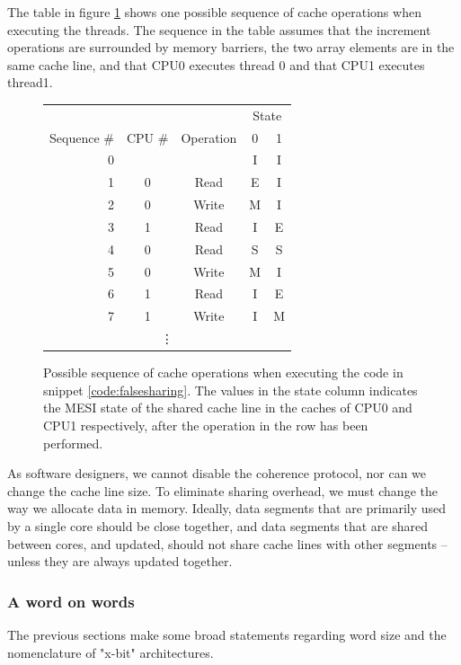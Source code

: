 The table in figure \ref{table:invalidationsequence} shows one possible sequence
of cache operations when executing the threads. The sequence in the table
assumes that the increment operations are surrounded by memory barriers, the two
array elements are in the same cache line, and that CPU0 executes thread 0 and
that CPU1 executes thread1.

\begin{figure}[hbtp]
	\centering
	\begin{tabular}{|r|c|c||c|c|}
	\hline
	& & & \multicolumn{2}{c|}{State} \\
		\cline{4-5}
	Sequence \# & CPU \# & Operation & 0 & 1\\
	\hline
	\hline
	0 & & & I & I\\
	\hline
	1 & 0 & Read & E & I\\
	\hline
	2 & 0 & Write & M & I\\
	\hline
	3 & 1 & Read & I & E\\
	\hline
	4 & 0 & Read & S & S\\
	\hline
	5 & 0 & Write & M & I\\
	\hline
	6 & 1 & Read & I & E\\
	\hline
	7 & 1 & Write & I & M\\
		\multicolumn{5}{c}{\vdots}
\end{tabular}
	\caption{Possible sequence of cache operations when executing the code
	in snippet \ref{code:falsesharing}. The values in the state column
	indicates the MESI state of the shared cache line in the caches of CPU0
	and CPU1 respectively, after the operation in the row has been performed.}
	\label{table:invalidationsequence}
\end{figure}

As software designers, we cannot disable the coherence protocol, nor can we
change the cache line size. To eliminate sharing overhead, we
must change the way we allocate data in memory. Ideally, data segments that are
primarily used by a single core should be close together, and data segments that
are shared between cores, and updated, should not share cache lines with other segments
-- unless they are always updated together.

\subsubsection{A word on words}
The previous sections make some broad statements regarding word size and the
nomenclature of "x-bit" architectures.

